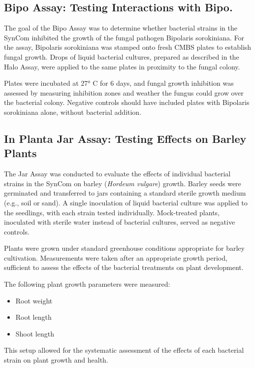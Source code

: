 \pagebreak

\subsection{Bipo Assay: Testing Interactions with Bipo.}
The goal of the Bipo Assay was to determine whether bacterial strains in the \ac{SynCom} inhibited the growth of the fungal pathogen Bipolaris sorokiniana. For the assay, Bipolaris sorokiniana was stamped onto fresh CMBS plates to establish fungal growth. Drops of liquid bacterial cultures, prepared as described in the Halo Assay, were applied to the same plates in proximity to the fungal colony.

Plates were incubated at 27° C for 6 days, and fungal growth inhibition was assessed by measuring inhibition zones and weather the fungus could grow over the bacterial colony. Negative controls should have included plates with Bipolaris sorokiniana alone, without bacterial addition.

\subsection{In Planta Jar Assay: Testing Effects on Barley Plants}
The Jar Assay was conducted to evaluate the effects of individual bacterial strains in the \ac{SynCom} on barley (\textit{Hordeum vulgare}) growth.
Barley seeds were germinated and transferred to jars containing a standard sterile growth medium (e.g., soil or sand). A single inoculation of liquid bacterial culture was applied to the seedlings, with each strain tested individually. Mock-treated plants, inoculated with sterile water instead of bacterial cultures, served as negative controls.

Plants were grown under standard greenhouse conditions appropriate for barley cultivation.
Measurements were taken after an appropriate growth period, sufficient to assess the effects of the bacterial treatments on plant development.

The following plant growth parameters were measured:
\begin{itemize}
    \item Root weight
    \item Root length
    \item Shoot length
\end{itemize}

This setup allowed for the systematic assessment of the effects of each bacterial strain on plant growth and health.
